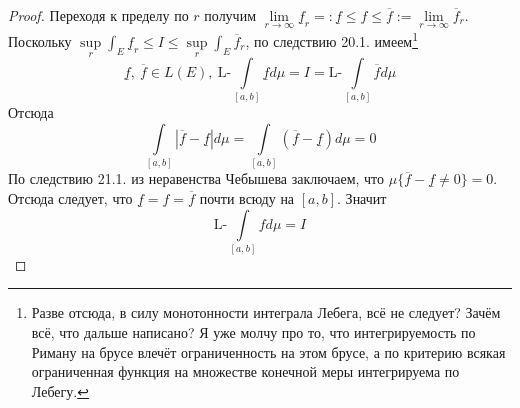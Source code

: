 \documentclass[11pt,a4paper]{report}
\theoremstyle{definition}
\theoremstyle{definition}
\theoremstyle{definition}
\begin{document}
\begin{proof}
		Переходя к пределу по $ r $ получим
		$
			\lim\limits_{r\to\infty} \underline{f}_{r} =: \underline{f} \le f \le \overline{f} :=  \lim\limits_{r\to\infty} \overline{f}_{r}
		$.\\
		Поскольку $ \sup\limits_{r} \int_{E} \underline{f}_{r} \le I \le \sup\limits_{r} \int_{E} \overline{f}_{r} $, по следствию  20.1. имеем\footnote{Разве отсюда, в силу монотонности интеграла Лебега, всё не следует? Зачём всё, что дальше написано? Я уже молчу про то, что интегрируемость по Риману на брусе влечёт ограниченность на этом брусе, а по критерию всякая ограниченная функция на множестве конечной меры интегрируема по Лебегу.}
		\[ \underline{f},\ \overline{f} \in L(E),\ \mbox{L-}\int\limits_{[a, b]} \underline{f} d\mu = I = \mbox{L-}\int\limits_{[a, b]} \overline{f} d\mu \]
		Отсюда 
		\[ 
			\int\limits_{[a, b]} | \overline{f} - \underline{f} | d\mu = \int\limits_{[a, b]} (\overline{f} - \underline{f}) d\mu = 0
		\]
		По следствию 21.1. из неравенства Чебышева заключаем, что $ \mu \{\overline{f} - \underline{f} \neq 0 \} = 0 $.\\
		Отсюда следует, что $ \underline{f} = f = \overline{f} $ почти всюду на $ [a, b] $. Значит\\
		\[
			\mbox{L-}\int\limits_{[a, b]} f d\mu = I
		\]
	\end{proof}
\end{document}
